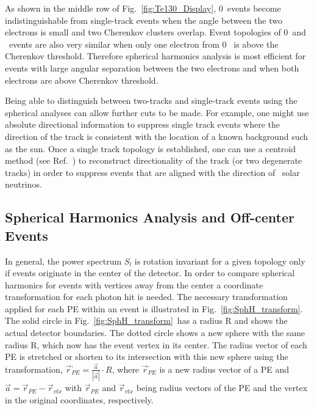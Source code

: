 As shown in the middle row of Fig.~\ref{fig:Te130_Display}, 0\nbb~events become indistinguishable from single-track events when the 
angle between the two electrons is small and two Cherenkov clusters overlap. Event topologies of 0\nbb~and \B~events are also 
very similar when only one electron from 0\nbb~ is above the Cherenkov threshold. Therefore spherical harmonics analysis is most 
efficient for events with large angular separation between the two electrons and when both electrons are above Cherenkov threshold.

Being able to distinguish between two-tracks and single-track events using the spherical analyses can allow further cuts to be made.  For example, one might use absolute directional information to suppress single track events where the direction of the track is consistent with the location of a known background such as the sun. Once a single track topology is established, one can use a centroid method (see Ref.~\cite{Directionality}) to reconstruct directionality of the track (or two degenerate tracks) in order to suppress events that are aligned with the direction of \B~solar neutrinos.


\subsection{Spherical Harmonics Analysis and Off-center Events}

In general, the power spectrum $S_l$ is rotation invariant for a given topology only if events originate in the center of the
detector. In order to compare spherical harmonics for events with vertices away from the center a coordinate transformation for each photon 
hit is needed. The necessary transformation applied for each PE within an event is illustrated in Fig.~\ref{fig:SphH_transform}. 
The solid circle in Fig.~\ref{fig:SphH_transform}~has a radius R and shows the actual detector boundaries. The dotted circle shows a new 
sphere with the same radius R, which now has the event vertex in its center. The radius vector of each PE is stretched or shorten to 
its intersection with this new sphere using the transformation, $\vec{r}^{,}_{PE} = \frac{\vec{a}}{|\vec{a}|} \cdot R$, 
where $\vec{r}^{,}_{PE}$ is a new radius vector of a PE and $\vec{a}=\vec{r}_{PE} - \vec{r}_{vtx}$ with $\vec{r}_{PE}$ and $\vec{r}_{vtx}$ 
being radius vectors of the PE and the vertex in the original coordinates, respectively.

